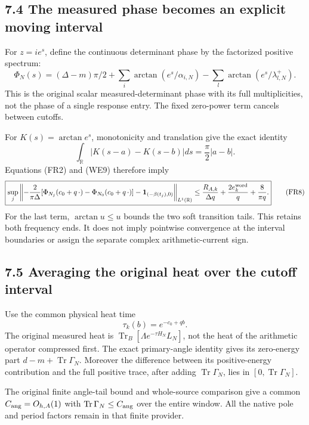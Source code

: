 \documentclass[10pt]{article}
\begin{document}
\subsection{7.4 The measured phase becomes an explicit moving interval}\label{the-measured-phase-becomes-an-explicit-moving-interval}

For \(z=ie^s\), define the continuous determinant phase by the factorized positive spectrum: \[
 \Phi_N(s)=(\Delta-m)\pi/2
 +\sum_i\arctan(e^s/\alpha_{i,N})
 -\sum_l\arctan(e^s/\lambda_{l,N}^+).
\tag{FR7}
\] This is the original scalar measured-determinant phase with its full multiplicities, not the phase of a single response entry. The fixed zero-power term cancels between cutoffs.

For \(K(s)=\arctan e^s\), monotonicity and translation give the exact identity \[
 \int_{\mathbb R}|K(s-a)-K(s-b)|ds=\frac\pi2|a-b|.
\] Equations (FR2) and (WE9) therefore imply \[
 \boxed{\sup_j\left\|
 -\frac2{\pi\Delta}
 [\Phi_{N_j}(c_0+q\,\cdot)-\Phi_{N_0}(c_0+q\,\cdot)]
 -\mathbf1_{(-\beta(t_j),0)}
 \right\|_{L^1(\mathbb R)}
 \le\frac{R_{A,k}}{\Delta q}
 +\frac{2e_k^{\rm word}}q+\frac8{\pi q}.}
 \tag{FR8}
\] For the last term, \(\arctan u\le u\) bounds the two soft transition tails. This retains both frequency ends. It does not imply pointwise convergence at the interval boundaries or assign the separate complex arithmetic-current sign.

\subsection{7.5 Averaging the original heat over the cutoff interval}\label{averaging-the-original-heat-over-the-cutoff-interval}

Use the common physical heat time \[
 \tau_k(b)=e^{-c_0+qb}.
\] The original measured heat is \(\operatorname{Tr}_B[\Lambda e^{-\tau H_N}L_N]\), not the heat of the arithmetic operator compressed first. The exact primary-angle identity gives its zero-energy part \(d-m+\operatorname{Tr}\Gamma_N\). Moreover the difference between its positive-energy contribution and the full positive trace, after adding \(\operatorname{Tr}\Gamma_N\), lies in \([0,\operatorname{Tr}\Gamma_N]\).

The original finite angle-tail bound and whole-source comparison give a common \(C_{\rm ang}=O_{h,A}(1)\) with \(\operatorname{Tr}\Gamma_N\le C_{\rm ang}\) over the entire window. All the native pole and period factors remain in that finite provider.
\end{document}
